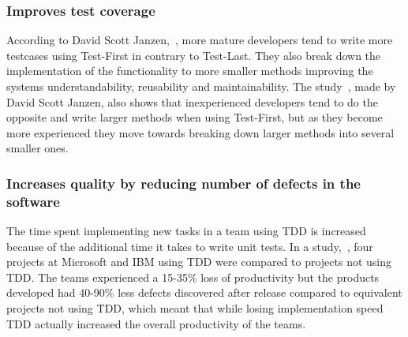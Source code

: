 \subsubsection*{Improves test coverage}
According to David Scott Janzen,~\cite{janzen}, more mature developers tend to write more testcases using Test-First in contrary to Test-Last. They also break down the implementation of the functionality to more smaller methods improving the systems understandability, reusability and maintainability. The study~\cite{janzen}, made by David Scott Janzen, also shows that inexperienced developers tend to do the opposite and write larger methods when using Test-First, but as they become more experienced they move towards breaking down larger methods into several smaller ones.

\subsubsection*{Increases quality by reducing number of defects in the software}
The time spent implementing new tasks in a team using TDD is increased because of the additional time it takes to write unit tests. In a study,~\cite{microsoftibm}, four projects at Microsoft and IBM using TDD were compared to projects not using TDD. The teams experienced a 15-35\% loss of productivity but the products developed had 40-90\% less defects discovered after release compared to equivalent projects not using TDD, which meant that while losing implementation speed TDD actually increased the overall productivity of the teams. 
  
%
%




